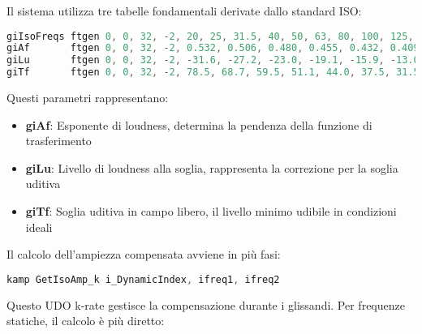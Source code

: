 Il sistema utilizza tre tabelle fondamentali derivate dallo standard ISO:

\begin{lstlisting}[language=C]
giIsoFreqs ftgen 0, 0, 32, -2, 20, 25, 31.5, 40, 50, 63, 80, 100, 125, 160, 200, 250, 315, 400, 500, 630, 800, 1000, 1250, 1600, 2000, 2500, 3150, 4000, 5000, 6300, 8000, 10000, 12500
giAf       ftgen 0, 0, 32, -2, 0.532, 0.506, 0.480, 0.455, 0.432, 0.409, 0.387, 0.367, 0.349, 0.330, 0.315, 0.301, 0.288, 0.276, 0.267, 0.259, 0.253, 0.250, 0.246, 0.244, 0.243, 0.243, 0.243, 0.242, 0.242, 0.245, 0.254, 0.271, 0.301
giLu       ftgen 0, 0, 32, -2, -31.6, -27.2, -23.0, -19.1, -15.9, -13.0, -10.3, -8.1, -6.2, -4.5, -3.1, -2.0, -1.1, -0.4, 0.0, 0.3, 0.5, 0.0, -2.7, -4.1, -1.0, 1.7, 2.5, 1.2, -2.1, -7.1, -11.2, -10.7, -3.1
giTf       ftgen 0, 0, 32, -2, 78.5, 68.7, 59.5, 51.1, 44.0, 37.5, 31.5, 26.5, 22.1, 17.9, 14.4, 11.4, 8.6, 6.2, 4.4, 3.0, 2.2, 2.4, 3.5, 1.7, -1.3, -4.2, -6.0, -5.4, -1.5, 6.0, 12.6, 13.9, 12.3
\end{lstlisting}

Questi parametri rappresentano:
\begin{itemize}
    \item \textbf{giAf}: Esponente di loudness, determina la pendenza della funzione di trasferimento
    \item \textbf{giLu}: Livello di loudness alla soglia, rappresenta la correzione per la soglia uditiva
    \item \textbf{giTf}: Soglia uditiva in campo libero, il livello minimo udibile in condizioni ideali
\end{itemize}

Il calcolo dell'ampiezza compensata avviene in più fasi:

\begin{lstlisting}[language=C]
kamp GetIsoAmp_k i_DynamicIndex, ifreq1, ifreq2
\end{lstlisting}

Questo UDO k-rate gestisce la compensazione durante i glissandi. Per frequenze statiche, il calcolo è più diretto:


